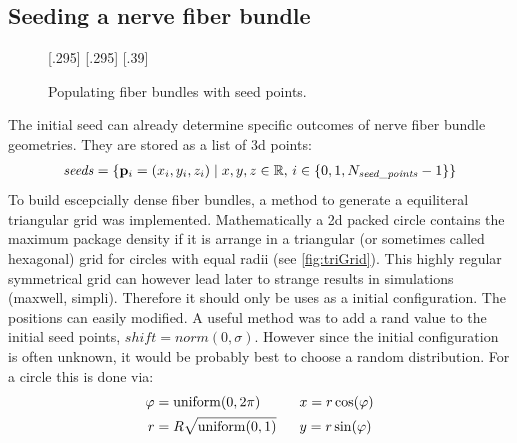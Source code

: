 \subsection{Seeding a nerve fiber bundle}\label{sec:seeds}
% 
\begin{figure}[!t]
    \def\tikzheight{0.25\textwidth}
    \centering
    [.295\textwidth]{
    \hfill}
    [.295\textwidth]{
    }\hfill
    [.39\textwidth]{
    \hfill}
	\caption{Populating fiber bundles with seed points.}
\end{figure}
% 
The initial seed can already determine specific outcomes of nerve fiber bundle geometries. 
They are stored as a list of 3d points:
\begin{align}
\mathit{seeds} = \left\{ \mathbf{p}_i=(x_i,y_i,z_i) \mid x,y,z \in \mathbb{R} , \, i \in \{0,1,N_{\mathit{seed\_points}}-1\}\right\}
\end{align}
% 
To build escepcially dense fiber bundles, a method to generate a equiliteral triangular grid was implemented.
Mathematically a 2d packed circle contains the maximum package density if it is arrange in a triangular (or sometimes called hexagonal) grid for circles with equal radii (see \ref{fig:triGrid}).
This highly regular symmetrical grid can however lead later to strange results in simulations (\eg maxwell, simpli).
Therefore it should only be uses as a initial configuration. 
The positions can easily modified.
A useful method was to add a rand value to the initial seed points, \eg $\mathit{shift} = norm(0,\sigma)$.
However since the initial configuration is often unknown, it would be probably best to choose a random distribution.
For a circle this is done via:
\begin{equation}
\begin{aligned}
 \varphi &= \mathrm{uniform}(0,2 \pi) \hspace{4.2ex} && x = r \cos(\varphi)\\
 r &= R \sqrt{\mathrm{uniform}(0,1)} && y = r \sin(\varphi)
\end{aligned}
\end{equation}
% 
